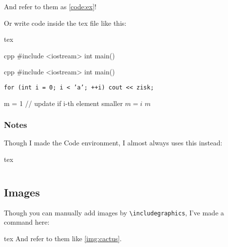 \documentclass{fhw}
\begin{document}
And refer to them as \cref{code:ex}!

Or write code inside the tex file like this:
\begin{Code}{tex}
\begin{Codee}{cpp}
#include <iostream>
int main() {}
\end{Codee} %
\end{Code}

\begin{Code}{cpp}
#include <iostream>
int main() {}
\end{Code}

\texttt{for (int i = 0; i < 'a'; ++i) cout << zisk; }

\begin{algorithm}
\begin{algorithmic}[1]
  \State m = 1
    \State // update if i-th element smaller
      \State $m = i$
    \EndIf
  \EndFor
  \State \Return $m$
  \EndProcedure
\end{algorithmic}
\end{algorithm}

\subsubsection{Notes}

Though I made the Code environment, I almost always uses this instead:
\begin{Code}{tex}
\begin{spacing}{1}
  \inputminted{py}{lab1/stackoverflow/solve.py}
\end{spacing}
\end{Code}

\subsection{Images}

Though you can manually add images by \verb|\includegraphics|, I've made a command here:
\begin{Code}{tex}
And refer to them like \cref{img:cactus}.
\end{Code}
\end{document}
